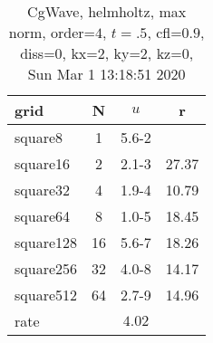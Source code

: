 \begin{table}[H]\tableFont %
\begin{center}
\begin{tabular}{|l|c|c|c|} \hline 
grid  & N &  $ u $ & r \\ \hline 
   square8 &     1 & \num{5.6}{-2} &       \\ \hline
  square16 &     2 & \num{2.1}{-3} & 27.37  \\ \hline
  square32 &     4 & \num{1.9}{-4} & 10.79  \\ \hline
  square64 &     8 & \num{1.0}{-5} & 18.45  \\ \hline
 square128 &    16 & \num{5.6}{-7} & 18.26  \\ \hline
 square256 &    32 & \num{4.0}{-8} & 14.17  \\ \hline
 square512 &    64 & \num{2.7}{-9} & 14.96  \\ \hline
    rate             &       &  $4.02$       &       \\ \hline
\end{tabular}
\caption{CgWave, helmholtz, max norm, order=$4$, $t=.5$, cfl=$0.9$, diss=$0$, kx=2, ky=2, kz=0, Sun Mar  1 13:18:51 2020}\label{table:helmholtzOrder4max}
\end{center}
\end{table}
